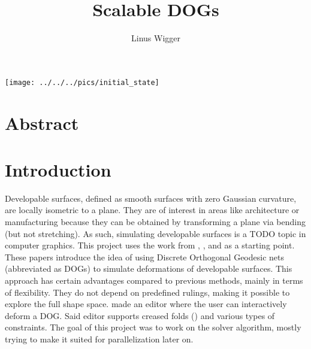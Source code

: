 \documentclass[a4paper,twoside,12pt,nochapterprefix]{scrbook}
\title{Scalable DOGs}
\author{Linus Wigger}
\begin{document}
\maketitle
{\centering \texttt{[image: ../../../pics/initial\_state]}\\}

\chapter{Abstract}\label{sec:abstract}
\chapter{Introduction}\label{sec:intro}\label{sec:prev_work}
Developable surfaces, defined as smooth surfaces with zero Gaussian curvature, are locally isometric to a plane. They are of interest in areas like architecture or manufacturing because they can be obtained by transforming a plane via bending (but not stretching). As such, simulating developable surfaces is a TODO topic in computer graphics.\newline
This project uses the work from \cite{Rabinovich:DogNets:2018}, \cite{Rabinovich:DogShapeSpace:2018}, and \cite{Rabinovich:CurvedFolds:2019} as a starting point. These papers introduce the idea of using Discrete Orthogonal Geodesic nets (abbreviated as DOGs) to simulate deformations of developable surfaces.
 This approach has certain advantages compared to previous methods, mainly in terms of flexibility. They do not depend on predefined rulings, making it possible to explore the full shape space.\newline %
\cite{Rabinovich:DogNets:2018} made an editor where the user can interactively deform a DOG. Said editor supports creased folds (\cite{Rabinovich:CurvedFolds:2019}) and various types of constraints. The goal of this project was to work on the solver algorithm, mostly trying to make it suited for parallelization later on.\newline

\end{document}

